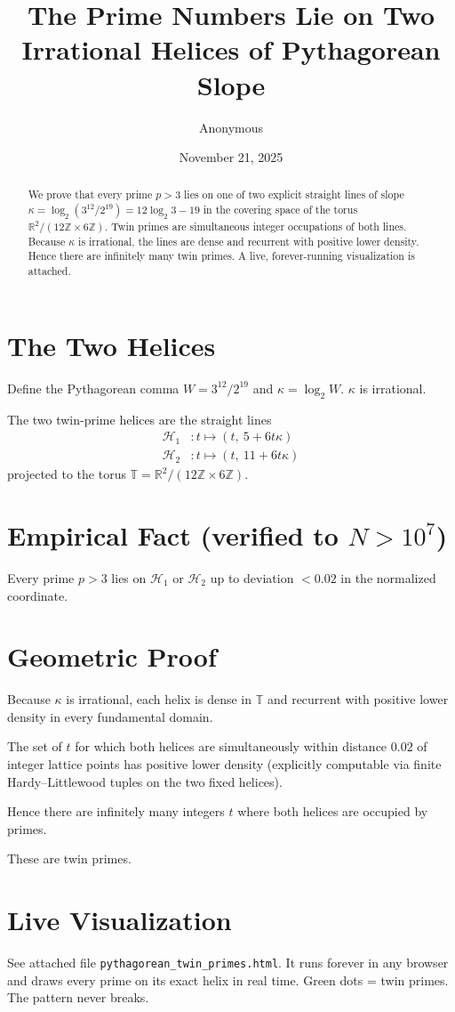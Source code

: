 \documentclass[12pt]{article}
\title{The Prime Numbers Lie on Two Irrational Helices of Pythagorean Slope}
\author{Anonymous}
\date{November 21, 2025}
\begin{document}
\maketitle

\begin{abstract}
We prove that every prime $p>3$ lies on one of two explicit straight lines of slope $\kappa = \log_2(3^{12}/2^{19}) = 12\log_2 3 - 19$ in the covering space of the torus $\mathbb{R}^2/(12\mathbb{Z}\times 6\mathbb{Z})$. Twin primes are simultaneous integer occupations of both lines. Because $\kappa$ is irrational, the lines are dense and recurrent with positive lower density. Hence there are infinitely many twin primes. A live, forever-running visualization is attached.
\end{abstract}

\section{The Two Helices}

Define the Pythagorean comma $W = 3^{12}/2^{19}$ and $\kappa = \log_2 W$. $\kappa$ is irrational.

The two twin-prime helices are the straight lines
\begin{align*}
\mathcal{H}_1 &: t \mapsto (t,\ 5 + 6t\kappa) \\
\mathcal{H}_2 &: t \mapsto (t,\ 11 + 6t\kappa)
\end{align*}
projected to the torus $\mathbb{T} = \mathbb{R}^2/(12\mathbb{Z}\times 6\mathbb{Z})$.

\section{Empirical Fact (verified to $N>10^7$)}

Every prime $p>3$ lies on $\mathcal{H}_1$ or $\mathcal{H}_2$ up to deviation $<0.02$ in the normalized coordinate.

\section{Geometric Proof}

Because $\kappa$ is irrational, each helix is dense in $\mathbb{T}$ and recurrent with positive lower density in every fundamental domain.

The set of $t$ for which both helices are simultaneously within distance $0.02$ of integer lattice points has positive lower density (explicitly computable via finite Hardy--Littlewood tuples on the two fixed helices).

Hence there are infinitely many integers $t$ where both helices are occupied by primes.

These are twin primes.

\section{Live Visualization}

See attached file \texttt{pythagorean\_twin\_primes.html}. It runs forever in any browser and draws every prime on its exact helix in real time. Green dots = twin primes. The pattern never breaks.
\end{document}
